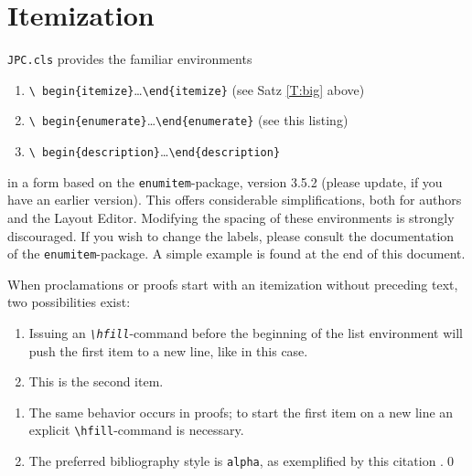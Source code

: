 \documentclass{CSLM} %
\theoremstyle{plain}\newtheorem{satz}[thm]{Satz} %
\begin{document}
\section{Itemization}\label{S:item}
  \texttt{JPC.cls} provides the familiar environments 
\begin{enumerate}
\item\texttt{\textbackslash
  begin\{itemize\}}\dots\texttt{\textbackslash end\{itemize\}} (see
 Satz \ref{T:big} above)
\item\texttt{\textbackslash
  begin\{enumerate\}}\dots\texttt{\textbackslash end\{enumerate\}}
  (see this listing)
\item\texttt{\textbackslash
    begin\{description\}}\dots\texttt{\textbackslash end\{description\}}
\end{enumerate}
  in a form based on the \texttt{enumitem}-package, version 3.5.2
  (please update, if you have an earlier version).  This offers
  considerable simplifications, both for authors and the Layout
  Editor.  Modifying the spacing of these environments is strongly
  discouraged.  If you wish to change the labels, please consult the
  documentation of the \texttt{enumitem}-package.  A simple example is
  found at the end of this document.

  When proclamations or proofs start with an itemization without
  preceding text, two possibilities exist:

\begin{thm}\label{T:m}\hfill  %
\begin{enumerate}
\item
  Issuing an {\em\texttt{\textbackslash hfill}}-command before the
  beginning of the list environment will push the first item to a new
  line, like in this case.
\item
  This is the second item.
\end{enumerate}
\end{thm}

\proof\hfill  %
\begin{enumerate}
\item
  The same behavior occurs in proofs; to start the first item on a
  new line an explicit \texttt{\textbackslash hfill}-command is necessary.
\item
  The preferred bibliography style is \texttt{alpha}, as exemplified
  by this citation \cite{koslowski:mib}.\qed
\end{enumerate}
\end{document}

